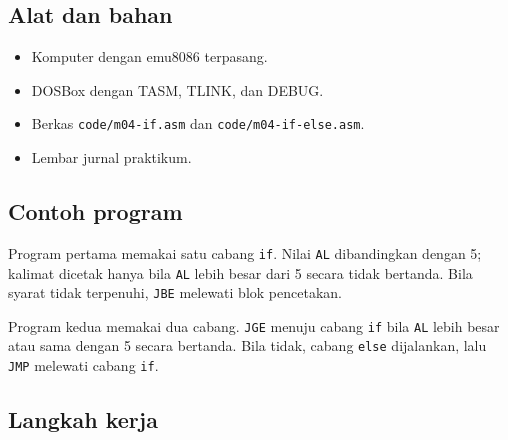 \subsection{Alat dan bahan}

\begin{itemize}
    \item Komputer dengan emu8086 terpasang.
    \item DOSBox dengan TASM, TLINK, dan DEBUG.
    \item Berkas \texttt{code/m04-if.asm} dan
          \texttt{code/m04-if-else.asm}.
    \item Lembar jurnal praktikum.
\end{itemize}

\subsection{Contoh program}

Program pertama memakai satu cabang \texttt{if}. Nilai \texttt{AL}
dibandingkan dengan 5; kalimat dicetak hanya bila \texttt{AL} lebih
besar dari 5 secara tidak bertanda. Bila syarat tidak terpenuhi,
\texttt{JBE} melewati blok pencetakan.



Program kedua memakai dua cabang. \texttt{JGE} menuju cabang
\texttt{if} bila \texttt{AL} lebih besar atau sama dengan 5 secara
bertanda. Bila tidak, cabang \texttt{else} dijalankan, lalu
\texttt{JMP} melewati cabang \texttt{if}.



\subsection{Langkah kerja}

